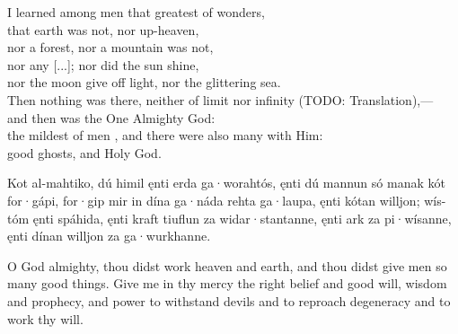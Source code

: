 \bvb I learned among men that greatest of wonders, \\
that earth was not, nor up-heaven, \\
nor a forest, nor a mountain was not, \\
nor any [...]; nor did the sun shine, \\
nor the moon give off light, nor the glittering sea. \\
Then nothing was there, neither of limit nor infinity (TODO: Translation),— \\
and then was the One Almighty God: \\
the mildest of men , and there were also many with Him: \\
good ghosts, and Holy God.\evb
\evg


\bpg
\bpa Kot al-mahtiko, dú himil ęnti erda ga·worahtós, ęnti dú mannun só manak kót for·gápi,
for·gip mir in dína ga·náda rehta ga·laupa, ęnti kótan willjon; wís-tóm ęnti spáhida, ęnti kraft tiuflun za widar·stantanne, ęnti ark za pi·wísanne, ęnti dínan willjon za ga·wurkhanne.\epa

\bpb O God almighty, thou didst work heaven and earth, and thou didst give men so many good things.
Give me in thy mercy the right belief and good will, wisdom and prophecy, and power to withstand devils and to reproach degeneracy and to work thy will.\epb
\epg
